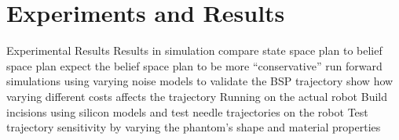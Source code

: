 \documentclass[0-suturing.tex]{subfiles}
\begin{document}
\section{Experiments and Results}
\label{sec:expt}


Experimental Results
Results in simulation
compare state space plan to belief space plan
expect the belief space plan to be more “conservative”
run forward simulations using varying noise models to validate the BSP trajectory
show how varying different costs affects the trajectory
Running on the actual robot
Build incisions using silicon models and test needle trajectories on the robot
Test trajectory sensitivity by varying the phantom’s shape and material properties
\end{document}
